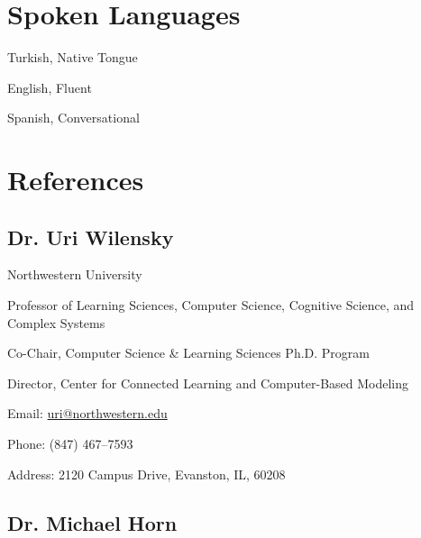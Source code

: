 \documentclass[11pt,letterpaper]{report} %
\newcommand{\listitemspace}{0.25em}
\renewenvironment{itemize}
{\begin{list}{}{\setlength{\leftmargin}{0em}
                \setlength{\parskip}{0em}
                \setlength{\itemsep}{\listitemspace}
                \setlength{\parsep}{\listitemspace}}}
{\end{list}}
\begin{document}
    \section*{Spoken Languages}

    \begin{itemize}

        \item Turkish, Native Tongue
        \item English, Fluent
        \item Spanish, Conversational

    \end{itemize}




    \section*{References}

    \subsection*{Dr. Uri Wilensky}

    \begin{itemize}

        \item Northwestern University
        \item Professor of Learning Sciences, Computer Science, Cognitive Science, and Complex Systems
        \item Co-Chair,  Computer Science \& Learning Sciences Ph.D. Program
        \item Director, Center for Connected Learning and Computer-Based Modeling
        \item Email: \href{mailto: uri@northwestern.edu}{uri@northwestern.edu}
        \item Phone: (847) 467--7593
        \item Address: 2120 Campus Drive, Evanston, IL, 60208

        \end{itemize}


    \subsection*{Dr. Michael Horn}
\end{document}
